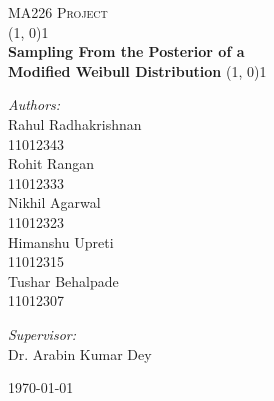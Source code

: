 \begin{titlepage}

\begin{center}

\textsc{\LARGE MA226 Project}\\[2.5cm]

\linethickness{0.5mm}
\line(1, 0){1\linewidth} \\[0.4cm]
{\huge \bfseries Sampling From the Posterior of a} \\[0.4cm]
{\huge \bfseries Modified Weibull Distribution}
\line(1, 0){1\linewidth} \\[2.5cm]

\begin{minipage}[t]{0.4\textwidth}
	\begin{flushleft} \large
	\emph{Authors:} \\[0.3cm]
	Rahul Radhakrishnan \\
	{\small 11012343} \\[0.1cm]
	Rohit Rangan \\
	{\small 11012333} \\[0.1cm]
	Nikhil Agarwal \\
	{\small 11012323} \\[0.1cm]
	Himanshu Upreti \\
	{\small 11012315} \\[0.1cm]
	Tushar Behalpade \\
	{\small 11012307} \\[0.1cm]
	\end{flushleft}
\end{minipage}
\begin{minipage}[t]{0.4\textwidth}
	\begin{flushright} \large
	\emph{Supervisor:} \\[0.3cm]
	Dr. Arabin Kumar Dey
	\end{flushright}
\end{minipage}

\vfill

{\large \today}

\end{center}

\end{titlepage}
